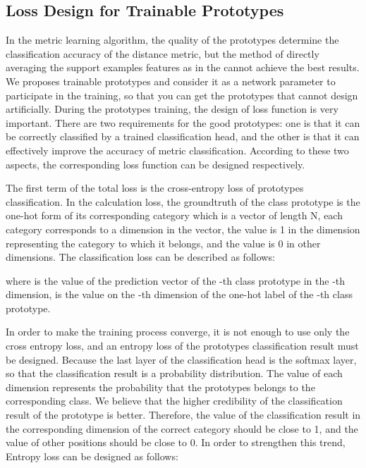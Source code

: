 \documentclass[conference]{IEEEtran}
\begin{document}
\subsection{Loss Design for Trainable Prototypes}\label{3.3}
In the metric learning algorithm, the quality of the prototypes determine the classification accuracy of the distance metric, but the method of directly averaging the support examples features as in the \cite{snell2017prototypical} cannot achieve the best results. We proposes trainable prototypes and consider it as a network parameter to participate in the training, so that you can get the prototypes that cannot design artificially. During the prototypes training, the design of loss function is very important. There are two requirements for the good prototypes: one is that it can be correctly classified by a trained classification head, and the other is that it can effectively improve the accuracy of metric classification. According to these two aspects, the corresponding loss function can be designed respectively.

The first term of the total loss is the cross-entropy loss of prototypes classification. In the calculation loss, the groundtruth of the class prototype is the one-hot form of its corresponding category which is a vector of length N, each category corresponds to a dimension in the vector, the value is 1 in the dimension representing the category to which it belongs, and the value is 0 in other dimensions. The classification loss can be described as follows:

where  is the value of the prediction vector of the -th class prototype in the -th dimension,  is the value on the -th dimension of the one-hot label of the -th class prototype. 

In order to make the training process converge, it is not enough to use only the cross entropy loss, and an entropy loss of the prototypes classification result must be designed. Because the last layer of the classification head is the softmax layer, so that the classification result is a probability distribution. The value of each dimension represents the probability that the prototypes belongs to the corresponding class. We believe that the higher credibility of the classification result of the prototype is better. Therefore, the value of the classification result in the corresponding dimension of the correct category should be close to 1, and the value of other positions should be close to 0. In order to strengthen this trend, Entropy loss can be designed as follows:
\end{document}
